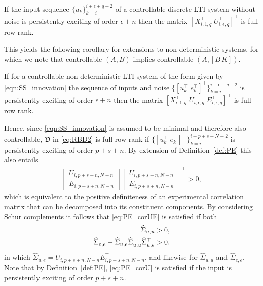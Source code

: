 \setcounter{thm}{0}
\begin{lem}
    If the input sequence $\{u_k\}_{k=i}^{i+\epsilon+q-2}$ of a controllable discrete \ac{LTI} system without noise is persistently exciting of order $\epsilon+n$ then the matrix $\left[X_{i,1,q}^\top\;U_{i,\epsilon,q}^\top\right]^\top$ is full row rank.
\end{lem}
This yields the following corollary for extensions to non-deterministic systems, for which we note that controllable $(A,B)$ implies controllable $(A,[B\,K])$.
\setcounter{thm}{0}
\begin{cor}
    If for a controllable non-deterministic \ac{LTI} system of the form given by \eqref{eqn:SS_innovation} the sequence of inputs and noise $\{[u_k^\top\;e_k^\top]^\top\}_{k=i}^{i+\epsilon+q-2}$ is persistently exciting of order $\epsilon+n$ then the matrix $\left[X_{i,1,q}^\top\;U_{i,\epsilon,q}^\top\;E_{i,\epsilon,q}^\top\right]^\top$ is full row rank.
\end{cor}
Hence, since \eqref{eqn:SS_innovation} is assumed to be minimal and therefore also controllable, $\mathfrak{D}$ in \eqref{eq:RBD2} is full row rank if $\{[u_k^\top\;e_k^\top]^\top\}_{k=i}^{i+p+s+N-2}$ is persistently exciting of order $p+s+n$. By extension of Definition~\ref{def:PE} this also entails
\begin{align}\label{eq:PE_corUE}
    \begin{bmatrix}
        U_{i,p+s+n,N-n}\\
        E_{i,p+s+n,N-n}
    \end{bmatrix}
    \begin{bmatrix}
        U_{i,p+s+n,N-n}\\
        E_{i,p+s+n,N-n}
    \end{bmatrix}^\top > 0,
\end{align}
which is equivalent to the positive definiteness of an experimental correlation matrix that can be decomposed into its constituent components. By considering Schur complements it follows that \eqref{eq:PE_corUE} is satisfied if both
\begin{align}%
    \widehat{\Sigma}_{u,u} &> 0,\label{eq:PE_corU}\\
    \widehat{\Sigma}_{e,e} - \widehat{\Sigma}_{u,e} \widehat{\Sigma}_{u,u}\inv \widehat{\Sigma}_{u,e}^\top&>0,\label{eq:PE_corUE2}
\end{align}
in which $\widehat{\Sigma}_{u,e}=U_{i,p+s+n,N-n}E_{i,p+s+n,N-n}^\top$, and likewise for $\widehat{\Sigma}_{u,u}$ and $\widehat{\Sigma}_{e,e}$. Note that by Definition~\ref{def:PE}, \eqref{eq:PE_corU} is satisfied if the input is persistently exciting of order $p+s+n$.

